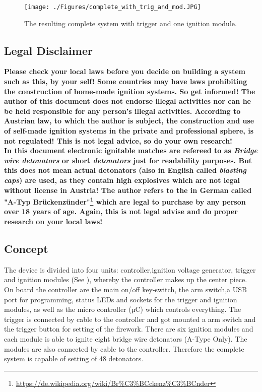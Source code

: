 \begin{figure}[!ht]
    \centering
    \texttt{[image: ./Figures/complete\_with\_trig\_and\_mod.JPG]}
    \caption{The resulting complete system with trigger and one ignition module.}
    \label{fig:complete_with_trig_and_mod}     
\end{figure}

\subsection{Legal Disclaimer}
\textbf{Please check your local laws before you decide on building a system such as this, by your self! Some countries may have laws prohibiting the construction of home-made ignition systems. So get informed! The author of this document does not endorse illegal activities nor can he be held responsible for any person's illegal activities. According to Austrian law, to which the author is subject, the construction and use of self-made ignition systems in the private and professional sphere, is not regulated! This is not legal advice, so do your own research!}\\

\noindent \textbf{In this document electronic ignitable matches are refereed to as \textit{Bridge wire detonators} or short \textit{detonators} just for readability purposes. But this does not mean actual detonators (also in English called \textit{blasting caps}) are used, as they contain high explosives which are not legal without license in Austria! The author refers to the in German called "A-Typ Brückenzünder"\footnote{\url{https://de.wikipedia.org/wiki/Br\%C3\%BCckenz\%C3\%BCnder}} which are legal to purchase by any person over 18 years of age. Again, this is not legal advise and do proper research on your local laws!}

\pagebreak
\subsection{Concept}
\label{Concept}
The device is divided into four units: controller,ignition voltage generator, trigger and ignition modules (See ), whereby the controller makes up the center piece. On board the controller are the main on/off key-switch, the arm switch,a USB port for programming, status LEDs and sockets for the trigger and ignition modules, as well as the micro controller (µC) which controls everything. The trigger is connected by cable to the controller and got mounted a arm switch and the trigger button for setting of the firework. There are six ignition modules and each module is able to ignite eight bridge wire detonators (A-Type Only). The modules are also connected by cable to the controller.  Therefore the complete system is capable of setting of 48 detonators.

